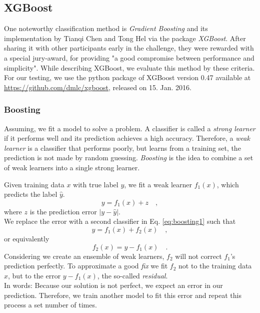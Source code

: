 \subsection{XGBoost}\label{sec:xgb}
One noteworthy classification method is \emph{Gradient Boosting} and its implementation by Tianqi Chen and Tong Hel via the package \emph{XGBoost}.
After sharing it with other participants early in the challenge, they were rewarded with a special jury-award, for providing "a good compromise between performance and simplicity"\cite{HEPml}. While describing XGBoost, we evaluate this method by these criteria.
For our testing, we use the python package of XGBoost version 0.47 available at \url{https://github.com/dmlc/xgboost}, released on 15. Jan. 2016.

\subsubsection{Boosting}
Assuming, we fit a model to solve a problem. A classifier is called a \emph{strong learner} if it performs well and its prediction achieves a high accuracy. Therefore, a \emph{weak learner} is a classifier that performs poorly, but learns from a training set, the prediction is not made by random guessing.
\emph{Boosting} is the idea to combine a set of weak learners into a single strong learner.

Given training data $x$ with true label $y$, we fit a weak learner $f_1(x)$, which predicts the label $\hat{y}$.
\begin{equation}\label{eq:boosting1}
	y = f_1(x) + z \mathrm{\hspace{1em} ,}
\end{equation}
where $z$ is the prediction error $|y-\hat{y}|$.\\
We replace the error with a second classifier in Eq. \eqref{eq:boosting1} such that
\begin{equation}\label{eq:boosting2}
	y = f_1(x) + f_2(x) \mathrm{\hspace{1em},}
\end{equation}
or equivalently
\begin{equation}\label{eq:boosting3}
	f_2(x) = y - f_1(x) \mathrm{\hspace{1em}.}
\end{equation}
Considering we create an ensemble of weak learners, $f_2$ will not correct $f_1$'s prediction perfectly. To approximate a good \emph{fix} we fit $f_2$ not to the training data $x$, but to the error $y - f_1(x)$, the so-called \emph{residual}.\\
In words: Because our solution is not perfect, we expect an error in our prediction. Therefore, we train another model to fit this error and repeat this process a set number of times.

